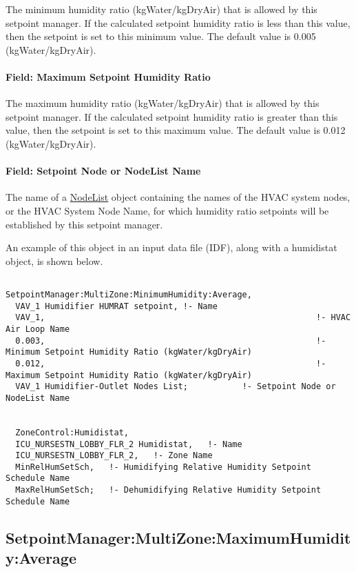 The minimum humidity ratio (kgWater/kgDryAir) that is allowed by this setpoint manager. If the calculated setpoint humidity ratio is less than this value, then the setpoint is set to this minimum value. The default value is 0.005 (kgWater/kgDryAir).

\paragraph{Field: Maximum Setpoint Humidity Ratio}\label{field-maximum-setpoint-humidity-ratio-1}

The maximum humidity ratio (kgWater/kgDryAir) that is allowed by this setpoint manager. If the calculated setpoint humidity ratio is greater than this value, then the setpoint is set to this maximum value. The default value is 0.012 (kgWater/kgDryAir).

\paragraph{Field: Setpoint Node or NodeList Name}\label{field-setpoint-node-or-nodelist-name-15}

The name of a \hyperref[nodelist]{NodeList} object containing the names of the HVAC system nodes, or the HVAC System Node Name, for which humidity ratio setpoints will be established by this setpoint manager.

An example of this object in an input data file (IDF), along with a humidistat object, is shown below.

\begin{lstlisting}

SetpointManager:MultiZone:MinimumHumidity:Average,
  VAV_1 Humidifier HUMRAT setpoint, !- Name
  VAV_1,                                                       !- HVAC Air Loop Name
  0.003,                                                       !- Minimum Setpoint Humidity Ratio (kgWater/kgDryAir)
  0.012,                                                       !- Maximum Setpoint Humidity Ratio (kgWater/kgDryAir)
  VAV_1 Humidifier-Outlet Nodes List;           !- Setpoint Node or NodeList Name


  ZoneControl:Humidistat,
  ICU_NURSESTN_LOBBY_FLR_2 Humidistat,   !- Name
  ICU_NURSESTN_LOBBY_FLR_2,   !- Zone Name
  MinRelHumSetSch,   !- Humidifying Relative Humidity Setpoint Schedule Name
  MaxRelHumSetSch;   !- Dehumidifying Relative Humidity Setpoint Schedule Name
\end{lstlisting}

\subsection{SetpointManager:MultiZone:MaximumHumidity:Average}\label{setpointmanagermultizonemaximumhumidityaverage}

